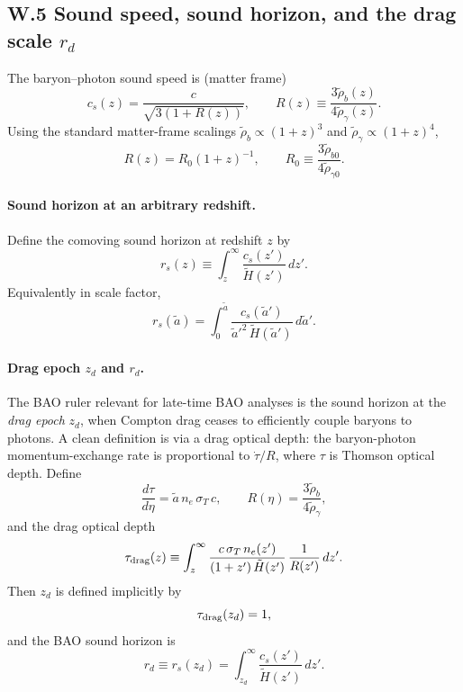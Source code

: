 \documentclass[10pt]{article}
\begin{document}
\subsection{W.5 Sound speed, sound horizon, and the drag scale $r_d$}
\label{app:early_universe:rd}

The baryon--photon sound speed is (matter frame)
\begin{equation}
c_s(z) = \frac{c}{\sqrt{3(1+R(z))}},
\qquad
R(z)\equiv \frac{3\tilde\rho_b(z)}{4\tilde\rho_\gamma(z)}.
\label{eq:W_cs}
\end{equation}
Using the standard matter-frame scalings $\tilde\rho_b\propto (1+z)^3$ and $\tilde\rho_\gamma\propto(1+z)^4$,
\begin{equation}
R(z)=R_0(1+z)^{-1},
\qquad
R_0\equiv \frac{3\tilde\rho_{b0}}{4\tilde\rho_{\gamma0}}.
\label{eq:W_Rz}
\end{equation}

\paragraph{Sound horizon at an arbitrary redshift.}
Define the comoving sound horizon at redshift $z$ by
\begin{equation}
r_s(z) \equiv \int_{z}^{\infty}\frac{c_s(z')}{\tilde H(z')}\,dz'.
\label{eq:W_rs_def}
\end{equation}
Equivalently in scale factor,
\begin{equation}
r_s(\tilde a) = \int_{0}^{\tilde a} \frac{c_s(\tilde a')}{\tilde a'^2\,\tilde H(\tilde a')}\,d\tilde a'.
\label{eq:W_rs_a}
\end{equation}

\paragraph{Drag epoch $z_d$ and $r_d$.}
The BAO ruler relevant for late-time BAO analyses is the sound horizon at the \emph{drag epoch} $z_d$,
when Compton drag ceases to efficiently couple baryons to photons. A clean definition is via a drag optical depth:
the baryon-photon momentum-exchange rate is proportional to $\dot\tau/R$, where $\tau$ is Thomson optical depth.
Define
\begin{equation}
\frac{d\tau}{d\eta} = \tilde a\,n_e\,\sigma_T\,c,
\qquad
R(\eta)=\frac{3\tilde\rho_b}{4\tilde\rho_\gamma},
\label{eq:W_tauprime}
\end{equation}
and the drag optical depth
\begin{equation}
\tau_{\rm drag}(z)
\equiv \int_{z}^{\infty}
\frac{c\,\sigma_T\,n_e(z')}{(1+z')\,\tilde H(z')}\,
\frac{1}{R(z')}\,dz'.
\label{eq:W_tau_drag}
\end{equation}
Then $z_d$ is defined implicitly by
\begin{equation}
\tau_{\rm drag}(z_d)=1,
\label{eq:W_zd_def}
\end{equation}
and the BAO sound horizon is
\begin{equation}
r_d \equiv r_s(z_d)=\int_{z_d}^{\infty}\frac{c_s(z')}{\tilde H(z')}\,dz'.
\label{eq:W_rd_def}
\end{equation}
\end{document}
